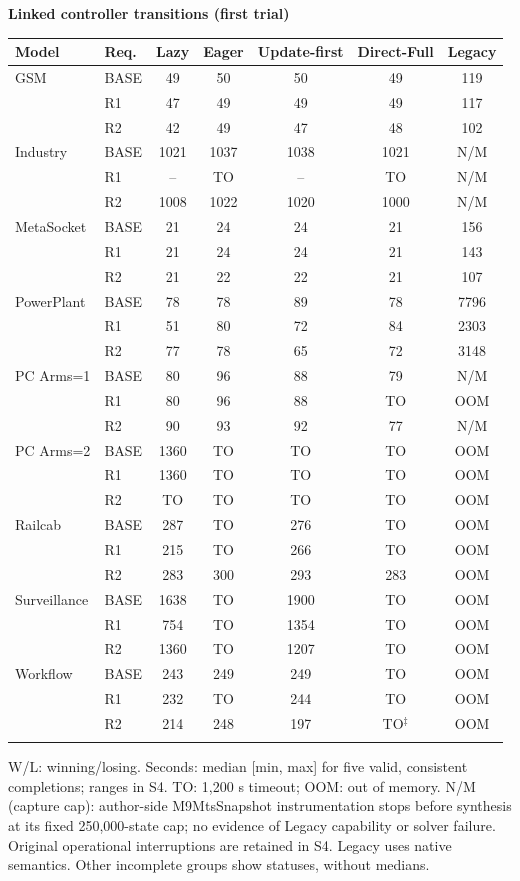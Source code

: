 \clearpage\noindent\textbf{Linked controller transitions (first trial)}\par\smallskip
\begingroup\scriptsize\setlength{\tabcolsep}{3pt}
\begin{tabular}{@{}llccccc@{}}
\toprule
Model & Req. & Lazy & Eager & Update-first & Direct-Full & Legacy\\
\midrule
GSM & BASE & 49 & 50 & 50 & 49 & 119\\
 & R1 & 47 & 49 & 49 & 49 & 117\\
 & R2 & 42 & 49 & 47 & 48 & 102\\
\addlinespace[2pt]
Industry & BASE & 1021 & 1037 & 1038 & 1021 & N/M\\
 & R1 & -- & TO & -- & TO & N/M\\
 & R2 & 1008 & 1022 & 1020 & 1000 & N/M\\
\addlinespace[2pt]
MetaSocket & BASE & 21 & 24 & 24 & 21 & 156\\
 & R1 & 21 & 24 & 24 & 21 & 143\\
 & R2 & 21 & 22 & 22 & 21 & 107\\
\addlinespace[2pt]
PowerPlant & BASE & 78 & 78 & 89 & 78 & 7796\\
 & R1 & 51 & 80 & 72 & 84 & 2303\\
 & R2 & 77 & 78 & 65 & 72 & 3148\\
\addlinespace[2pt]
PC Arms=1 & BASE & 80 & 96 & 88 & 79 & N/M\\
 & R1 & 80 & 96 & 88 & TO & OOM\\
 & R2 & 90 & 93 & 92 & 77 & N/M\\
\addlinespace[2pt]
PC Arms=2 & BASE & 1360 & TO & TO & TO & OOM\\
 & R1 & 1360 & TO & TO & TO & OOM\\
 & R2 & TO & TO & TO & TO & OOM\\
\addlinespace[2pt]
Railcab & BASE & 287 & TO & 276 & TO & OOM\\
 & R1 & 215 & TO & 266 & TO & OOM\\
 & R2 & 283 & 300 & 293 & 283 & OOM\\
\addlinespace[2pt]
Surveillance & BASE & 1638 & TO & 1900 & TO & OOM\\
 & R1 & 754 & TO & 1354 & TO & OOM\\
 & R2 & 1360 & TO & 1207 & TO & OOM\\
\addlinespace[2pt]
Workflow & BASE & 243 & 249 & 249 & TO & OOM\\
 & R1 & 232 & TO & 244 & TO & OOM\\
 & R2 & 214 & 248 & 197 & TO$^{\ddagger}$ & OOM\\
\addlinespace[2pt]
\bottomrule
\end{tabular}\endgroup

\par{\scriptsize W/L: winning/losing. Seconds: median [min, max] for five valid, consistent completions; ranges in S4. TO: 1,200 s timeout; OOM: out of memory. N/M (capture cap): author-side M9MtsSnapshot instrumentation stops before synthesis at its fixed 250,000-state cap; no evidence of Legacy capability or solver failure. Original operational interruptions are retained in S4. Legacy uses native semantics. Other incomplete groups show statuses, without medians.}
